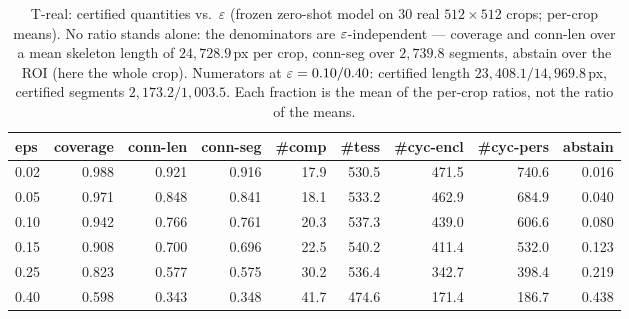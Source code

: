 \begin{table}[t]
\centering
\caption{T-real: certified quantities vs.\ $\varepsilon$ (frozen zero-shot model on 30 real $512\times512$ crops; per-crop means). No ratio stands alone: the denominators are $\varepsilon$-independent --- coverage and conn-len over a mean skeleton length of $24{,}728.9$\,px per crop, conn-seg over $2{,}739.8$ segments, abstain over the ROI (here the whole crop). Numerators at $\varepsilon=0.10/0.40$: certified length $23{,}408.1/14{,}969.8$\,px, certified segments $2{,}173.2/1{,}003.5$. Each fraction is the mean of the per-crop ratios, not the ratio of the means.}
\label{tab:real}
\small
\begin{tabular}{lrrrrrrrr}
\toprule
\textbf{eps} & \textbf{coverage} & \textbf{conn-len} & \textbf{conn-seg} & \textbf{\#comp} & \textbf{\#tess} & \textbf{\#cyc-encl} & \textbf{\#cyc-pers} & \textbf{abstain} \\
\midrule
0.02 & 0.988 & 0.921 & 0.916 & 17.9 & 530.5 & 471.5 & 740.6 & 0.016 \\
0.05 & 0.971 & 0.848 & 0.841 & 18.1 & 533.2 & 462.9 & 684.9 & 0.040 \\
0.10 & 0.942 & 0.766 & 0.761 & 20.3 & 537.3 & 439.0 & 606.6 & 0.080 \\
0.15 & 0.908 & 0.700 & 0.696 & 22.5 & 540.2 & 411.4 & 532.0 & 0.123 \\
0.25 & 0.823 & 0.577 & 0.575 & 30.2 & 536.4 & 342.7 & 398.4 & 0.219 \\
0.40 & 0.598 & 0.343 & 0.348 & 41.7 & 474.6 & 171.4 & 186.7 & 0.438 \\
\bottomrule
\end{tabular}
\end{table}
